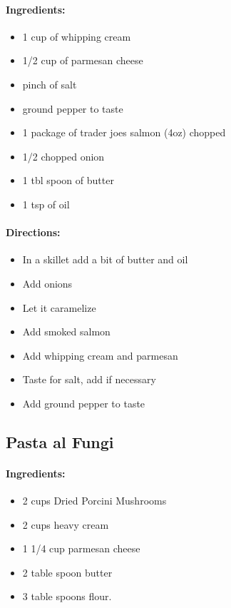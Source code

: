 \documentclass{article}
\begin{document}
\paragraph{Ingredients:}

\begin{itemize}
	\item 1 cup of whipping cream
	\item 1/2 cup of parmesan cheese
	\item pinch of salt
	\item ground pepper to taste
	\item 1 package of trader joes salmon (4oz) chopped
	\item 1/2 chopped onion
	\item 1 tbl spoon of butter
	\item 1 tsp of oil
\end{itemize}

\paragraph{Directions:}
\begin{itemize}
	\item In a skillet add a bit of butter and oil
	\item Add onions
	\item Let it caramelize
	\item Add smoked salmon
	\item Add whipping cream and parmesan
	\item Taste for salt, add if necessary
	\item Add ground pepper to taste
\end{itemize}

\subsection{Pasta al Fungi}

\paragraph{Ingredients:}

\begin{itemize}
	\item 2 cups Dried Porcini Mushrooms
	\item 2 cups heavy cream
	\item 1 1/4 cup parmesan cheese
	\item 2 table spoon butter
	\item 3 table spoons flour.
\end{itemize}
\end{document}
